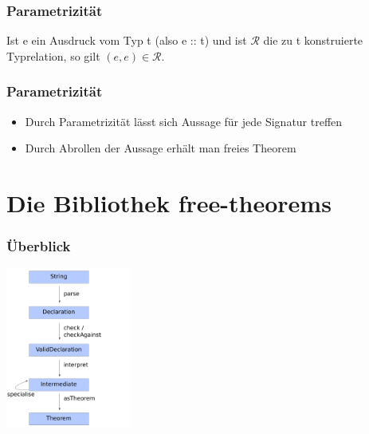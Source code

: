 \documentclass{beamer}
\begin{document}

\begin{frame}
\frametitle{Parametrizität}

\begin{Theorem}[Parametrizität]
Ist e ein Ausdruck vom Typ t (also e :: t) und ist $\mathcal{R}$ die zu t konstruierte Typrelation, so gilt
$(e, e) \in \mathcal{R}$.
\end{Theorem}

\end{frame}


\begin{frame}
\frametitle{Parametrizität}

\begin{itemize}
\item Durch Parametrizität lässt sich Aussage für jede Signatur treffen
\item Durch Abrollen der Aussage erhält man freies Theorem
\end{itemize}

\end{frame}



\section{Die Bibliothek free-theorems}

\begin{frame}
\frametitle{Überblick}
\begin{center}
\includegraphics[height=200px]{overview-free-theorems}
\end{center}
\end{frame}
\end{document}
